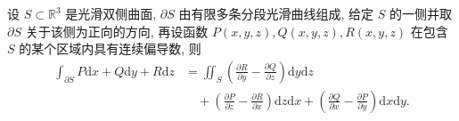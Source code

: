 \documentclass[UTF8,12pt,a4paper,fontset=fandol]{ctexart}
\begin{document}
\begin{theorem}[斯托克斯公式]\label{course-theorem-16-5-3}\quad 设 $S\subset\mathbb R^3$ 是光滑双侧曲面, $\partial S$ 由有限多条分段光滑曲线组成, 给定 $S$ 的一侧并取 $\partial S$ 关于该侧为正向的方向, 再设函数 $P(x,y,z),Q(x,y,z),R(x,y,z)$ 在包含 $S$ 的某个区域内具有连续偏导数, 则
\[
\begin{aligned}
  \int_{\partial S}P\mathrm dx+Q\mathrm dy+R\mathrm dz
  &=\iint_S\left(\frac{\partial R}{\partial y}-\frac{\partial Q}{\partial z}\right)\mathrm dy\mathrm dz\\
  &\quad+\left(\frac{\partial P}{\partial z}-\frac{\partial R}{\partial x}\right)\mathrm dz\mathrm dx
    +\left(\frac{\partial Q}{\partial x}-\frac{\partial P}{\partial y}\right)\mathrm dx\mathrm dy.
\end{aligned}
\]

\end{theorem}
\end{document}
